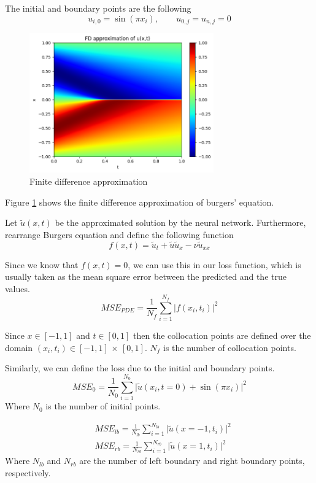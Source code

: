 \documentclass[a4paper,12pt]{article}
\theoremstyle{definition}
\begin{document}
The initial and boundary points are the following
$$
u_{i,0} = \sin(\pi x_i), \qquad u_{0,j} = u_{n,j} = 0
$$

\begin{figure}
    \centering
    \includegraphics[width=300px]{images/FD_burgers_pde.png}
    \vspace{-1em}
    \caption{Finite difference approximation}
    \label{fd_burgers}
\end{figure}

Figure \ref{fd_burgers} shows the finite difference approximation of burgers' equation.

Let $\tilde{u}(x,t)$ be the approximated solution by the neural network. 
Furthermore, rearrange Burgers equation and define the following function
\begin{equation}
f(x,t) = \tilde{u}_t + \tilde{u} \tilde{u}_x - \nu \tilde{u}_{xx}
\end{equation}

Since we know that $f(x,t) = 0$, we can use this in our loss function, which is usually 
taken as the mean square error between the predicted and the true values.
\begin{equation}
MSE_{PDE} = \frac{1}{N_f} \sum_{i=1}^{N_f} \Big|f(x_i, t_i)\Big|^2
\end{equation}

Since $x\in [-1,1]$ and $t\in [0,1]$ then the collocation points are defined over 
the domain $(x_i, t_i) \in [-1,1] \, \times \, [0,1]$. $N_f$ is the number of collocation points.

Similarly, we can define the loss due to the initial and boundary points.
\begin{equation}
MSE_{0} = \frac{1}{N_0} \sum_{i=1}^{N_0} \Big| \tilde{u}(x_i, t=0) + \sin(\pi x_i)\Big|^2
\end{equation}
Where $N_0$ is the number of initial points.

\begin{equation}
\begin{aligned}
&MSE_{lb} = \frac{1}{N_{lb}} \sum_{i=1}^{N_{lb}} \Big| \tilde{u}(x=-1, t_i) \Big|^2 \\
&MSE_{rb} = \frac{1}{N_{rb}} \sum_{i=1}^{N_{rb}} \Big| \tilde{u}(x=1, t_i) \Big|^2
\end{aligned}
\end{equation}
Where $N_{lb}$ and $N_{rb}$ are the number of left boundary and right boundary points, respectively.
\end{document}
